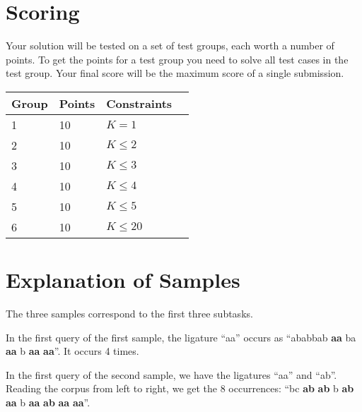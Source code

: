 \section*{Scoring}
Your solution will be tested on a set of test groups, each worth a number of points.
To get the points for a test group you need to solve all test cases in the test group.
Your final score will be the maximum score of a single submission.

\noindent
\begin{tabular}{| l | l | l | l |}
\hline
Group & Points & Constraints \\ \hline
1     & 10     & $K = 1$ \\ \hline
2     & 10     & $K \le 2$ \\ \hline
3     & 10     & $K \le 3$ \\ \hline
4     & 10     & $K \le 4$ \\ \hline
5     & 10     & $K \le 5$ \\ \hline
6     & 10     & $K \le 20$ \\ \hline
\end{tabular}

\section*{Explanation of Samples}
The three samples correspond to the first three subtasks.

In the first query of the first sample, the ligature ``aa'' occurs as ``ababbab \textbf{aa} ba \textbf{aa} b \textbf{aa} \textbf{aa}''.
It occurs 4 times.

In the first query of the second sample, we have the ligatures ``aa'' and ``ab''.
Reading the corpus from left to right, we get the 8 occurrences:
``bc \textbf{ab} \textbf{ab} b \textbf{ab} \textbf{aa} b \textbf{aa} \textbf{ab} \textbf{aa} \textbf{aa}''.
